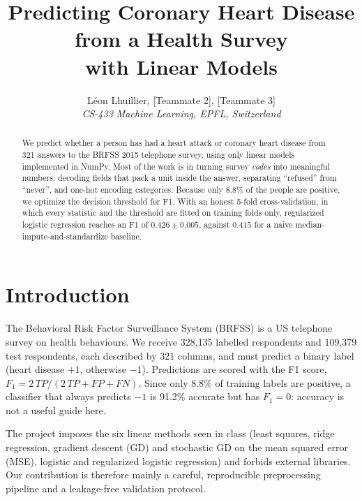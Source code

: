 \documentclass[10pt,conference,compsocconf]{IEEEtran}
\begin{document}
\title{Predicting Coronary Heart Disease from a Health Survey\\with Linear Models}

\author{
  L\'eon Lhuillier, [Teammate 2], [Teammate 3]\\
  \textit{CS-433 Machine Learning, EPFL, Switzerland}
}

\maketitle

\begin{abstract}
We predict whether a person has had a heart attack or coronary heart disease
from 321 answers to the BRFSS 2015 telephone survey, using only linear models
implemented in NumPy. Most of the work is in turning survey \emph{codes} into
meaningful numbers: decoding fields that pack a unit inside the answer,
separating ``refused'' from ``never'', and one-hot encoding categories.
Because only 8.8\% of the people are positive, we optimize the decision
threshold for F1. With an honest 5-fold cross-validation, in which every
statistic and the threshold are fitted on training folds only, regularized
logistic regression reaches an F1 of $0.426\pm0.005$, against $0.415$ for a
naive median-impute-and-standardize baseline.
\end{abstract}

\section{Introduction}

The Behavioral Risk Factor Surveillance System (BRFSS) is a US telephone
survey on health behaviours. We receive 328{,}135 labelled respondents and
109{,}379 test respondents, each described by 321 columns, and must predict a
binary label (heart disease $+1$, otherwise $-1$). Predictions are scored with
the F1 score, $F_1 = 2\,TP/(2\,TP+FP+FN)$. Since only 8.8\% of training
labels are positive, a classifier that always predicts $-1$ is 91.2\%
accurate but has $F_1=0$: accuracy is not a useful guide here.

The project imposes the six linear methods seen in class (least squares,
ridge regression, gradient descent (GD) and stochastic GD on the mean squared
error (MSE), logistic and regularized logistic regression) and forbids external
libraries. Our contribution is therefore mainly a careful, reproducible
preprocessing pipeline and a leakage-free validation protocol.
\end{document}
